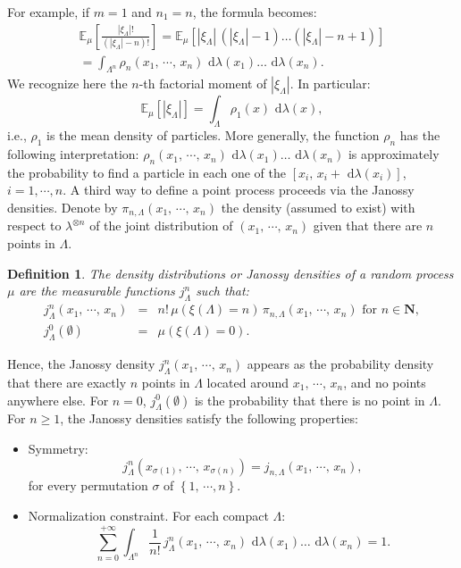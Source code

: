 \documentclass[11pt,a4paper]{amsart}
\newtheorem{Definition}{Definition}
\begin{document}
For example, if $m=1$ and $n_1=n$, the formula becomes:
\begin{multline*}
  {{\mathbb E}_{{\mu}}\left[{{\frac{|\xi_\Lambda|!}{(|\xi_{\Lambda}|-n)!}}}\right]}
  ={{\mathbb E}_{{\mu}}\left[{{|\xi_{\Lambda}|\, (|\xi_\Lambda|-1)\ldots(|\xi_\Lambda|-n+1)}}\right]}\\
  =\int_{\Lambda^n}{\rho_n(x_1,\, \cdots,\,
    x_n){\text{ d}}\lambda(x_1)\ldots{\text{ d}}\lambda(x_n)}.
\end{multline*}
We recognize here the $n$-th factorial moment of $|\xi_\Lambda|$.  In
particular:
\begin{equation*} {{\mathbb E}_{{\mu}}\left[{{|\xi_\Lambda|}}\right]}
  =\int_{\Lambda}{\rho_1(x){\text{ d}}\lambda(x)},
\end{equation*}
i.e., $\rho_1$ is the mean density of particles. More generally, the
function $\rho_n$ has the following interpretation: $\rho_n(x_1,\,
\cdots,\, x_n){\text{ d}}\lambda(x_1)\ldots{\text{ d}}\lambda(x_n)$ is approximately the
probability to find a particle in each one of the $[x_i,\, x_i+{\text{ d}}
\lambda(x_i)]$, $i=1,\cdots, n$.  A third way to define a point
process proceeds via the Janossy densities. Denote by
$\pi_{n,\Lambda}(x_1,\, \cdots,\, x_n)$ the density (assumed to exist)
with respect to $\lambda^{\otimes n}$ of the joint distribution of
$(x_1,\, \cdots,\, x_n) $ given that there are $n$ points in
$\Lambda$.
\begin{Definition}
  The density distributions or Janossy densities of a random process
  $\mu$ are the measurable functions $j^n_{\Lambda}$ such that:
  \begin{eqnarray*}
    j^n_{\Lambda}(x_1,\, \cdots,\, x_n) &=& n!\, \mu(\xi(\Lambda)=n)\, \pi_{n,\Lambda}(x_1,\, \cdots,\, x_n)
    \text{ for }n \in {{\mathbf N}},\\
    j^0_{\Lambda}(\emptyset) &=& \mu(\xi(\Lambda)=0).
  \end{eqnarray*}
\end{Definition}
Hence, the Janossy density $j^n_{\Lambda}(x_{1},\, \cdots,\, x_{n})$
appears as the probability density that there are exactly $n$ points
in $\Lambda$ located around $x_{1},\, \cdots,\, x_{n}$, and no points anywhere else. For
$n=0$, $j^0_{\Lambda}(\emptyset)$ is the probability that there is no
point in $\Lambda$. For $n \geq 1$, the Janossy densities satisfy the
following properties:
\begin{itemize}
\item Symmetry: \begin{equation*} j^n_{\Lambda}\left( x_{\sigma(1)},\,
      \cdots,\, x_{\sigma(n)}\right) =j_{n,\Lambda}\left( x_{1},\,
      \cdots,\, x_{n}\right),
  \end{equation*}
  for every permutation $\sigma$ of $\left\lbrace 1,\, \cdots,n
  \right\rbrace$.
\item Normalization constraint. For each compact $\Lambda$:
  \begin{equation*}
    \sum_{n=0}^{+\infty}\int_{\Lambda^n}{
      \frac{1}{n!}\, j^n_{\Lambda}\left( x_{1},\, \cdots,\, x_{n}\right)
      {\text{ d}}\lambda(x_1)\ldots{\text{ d}}\lambda(x_n) }=1.
  \end{equation*}
\end{itemize}
\end{document}
